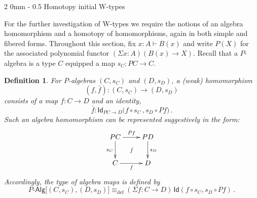 \documentclass[reqno,10pt,a4paper,oneside]{amsart}
\makeatletter
\numberwithin{equation}{section}
\renewcommand{\subsection}{\@startsection
  {subsection}%
  {2}%
  {0mm}%
  {-\baselineskip}%
  {0.5\baselineskip}%
  {\normalfont\normalsize\bf}}%
\theoremstyle{mythm}
\theoremstyle{mydef}
\newtheorem{definition}[theorem]{Definition}
\theoremstyle{myrmk}
\newcommand{\deq}{\equiv}
\newcommand{\defeq}{\deq_{\mathrm{def}}}
\newcommand{\prd}[1]{\Pi_{#1}}
\newcommand{\lam}[1]{\lambda_{#1}}
\newcommand{\Id}{\mathsf{Id}}
\newcommand{\id}[1]{\Id_{#1}}
\newcommand{\W}{\mathsf{W}}
\newcommand{\wsup}{\mathsf{sup}}
\newcommand{\UU}{\mathsf{U}}
\newcommand{\Palg}{P\text{-}\mathsf{Alg}}
\makeatother
\begin{document}
%



\subsection{Homotopy initial W-types}

For the further investigation of W-types we require the notions of an algebra homomorphism and a homotopy of homomorphisms, again in both simple and fibered forms.  Throughout this section, fix $x:A\vdash B(x)$ and write $P(X)$ for the associated polynomial functor $(\Sigma x : A) (B(x) \rightarrow X)$.  Recall that a $P$-algebra is a type $C$ equipped a map
$s_C :  PC \rightarrow C$.  

\begin{definition}
For $P$-algebras $(C,s_C)$ and $(D,s_D)$, a \emph{(weak) 
homomorphism}  $$(f, \bar{f}) : (C, s_C) \rightarrow (D, s_D)$$
consists of a map $f : C \rightarrow D$ and an identity,
\[
\bar{f} : \id{PC \rightarrow D}\big( f \circ s_C \, ,  s_{D} \circ Pf \big) \, .
\]
Such an algebra homomorphism can be represented suggestively in the form:
\[
\xymatrix{
 PC \ar[d]_{s_C} \ar[r]^{Pf}  \ar@{}[dr]|{\bar{f}} &  PD \ar[d]^{s_D}\\
C \ar[r]_{f}   & D }
\] 
Accordingly, the type of algebra maps is defined by
\[
\Palg
\big[ (C,s_C), (D, s_D)  \big]
 \defeq  
(\Sigma f:  C \rightarrow D) \, \Id(f\circ s_C, s_D\circ Pf) \, .
\]
\end{definition}
\medskip
\end{document}
